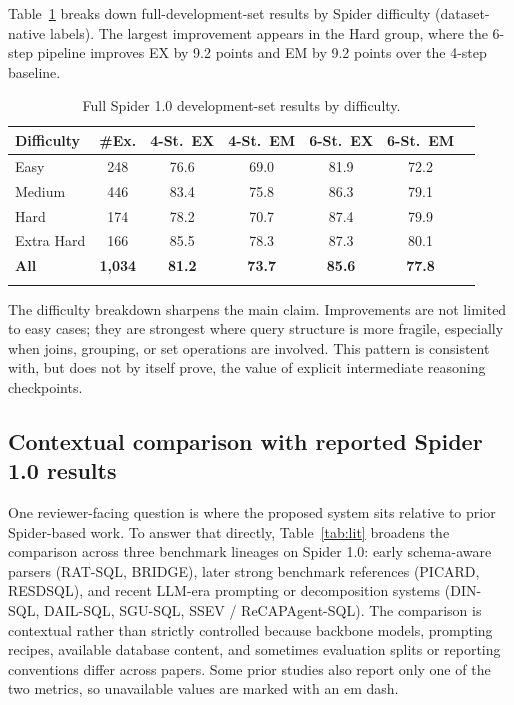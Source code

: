 Table~\ref{tab:difficulty} breaks down full-development-set results by Spider difficulty (dataset-native labels). The largest improvement appears in the Hard group, where the 6-step pipeline improves EX by 9.2 points and EM by 9.2 points over the 4-step baseline.

\begin{table}[t]
\caption{Full Spider 1.0 development-set results by difficulty.}\label{tab:difficulty}%
\centering
\small
\begin{tabular}{@{}lcccccc@{}}
\toprule
Difficulty & \#Ex. & 4-St.\ EX & 4-St.\ EM & 6-St.\ EX & 6-St.\ EM \\
\midrule
Easy & 248 & 76.6 & 69.0 & 81.9 & 72.2 \\
Medium & 446 & 83.4 & 75.8 & 86.3 & 79.1 \\
Hard & 174 & 78.2 & 70.7 & 87.4 & 79.9 \\
Extra Hard & 166 & 85.5 & 78.3 & 87.3 & 80.1 \\
\textbf{All} & \textbf{1,034} & \textbf{81.2} & \textbf{73.7} & \textbf{85.6} & \textbf{77.8} \\
\botrule
\end{tabular}
\end{table}

The difficulty breakdown sharpens the main claim. Improvements are not limited to easy cases; they are strongest where query structure is more fragile, especially when joins, grouping, or set operations are involved. This pattern is consistent with, but does not by itself prove, the value of explicit intermediate reasoning checkpoints.

\subsection{Contextual comparison with reported Spider 1.0 results}\label{subsec:lit}

One reviewer-facing question is where the proposed system sits relative to prior Spider-based work. To answer that directly, Table~\ref{tab:lit} broadens the comparison across three benchmark lineages on Spider 1.0: early schema-aware parsers (RAT-SQL, BRIDGE), later strong benchmark references (PICARD, RESDSQL), and recent LLM-era prompting or decomposition systems (DIN-SQL, DAIL-SQL, SGU-SQL, SSEV / ReCAPAgent-SQL). The comparison is contextual rather than strictly controlled because backbone models, prompting recipes, available database content, and sometimes evaluation splits or reporting conventions differ across papers. Some prior studies also report only one of the two metrics, so unavailable values are marked with an em dash.

